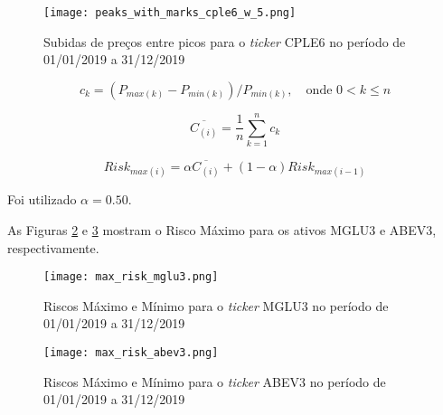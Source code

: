 \begin{itemize}
    \begin{figure}[h]
        \texttt{[image: peaks\_with\_marks\_cple6\_w\_5.png]}
        \centering
        \caption{Subidas de preços entre picos para o \textit{ticker} CPLE6 no período de 01/01/2019 a 31/12/2019}
        \label{fig:107}
    \end{figure}

    \begin{equation} \label{eq:40}
        c_k = (P_{max(k)} - P_{min(k)}) / P_{min(k)}, \quad \textrm{onde } 0 < k \le n
    \end{equation}

    \begin{equation} \label{eq:41}
        \overline{C_{(i)}} = \dfrac{1}{n} \sum_{k=1}^{n} c_k
    \end{equation}

    \begin{equation} \label{eq:42}
        Risk_{max(i)} = \alpha \overline{C_{(i)}} + (1 - \alpha) Risk_{max(i-1)}
    \end{equation}




    Foi utilizado \begin{math} \alpha = 0.50 \end{math}.

    As Figuras \ref{fig:108} e \ref{fig:270} mostram o Risco Máximo para os ativos MGLU3 e ABEV3, respectivamente.

    \begin{figure}[h]
        \texttt{[image: max\_risk\_mglu3.png]}
        \centering
        \caption{Riscos Máximo e Mínimo para o \textit{ticker} MGLU3 no período de 01/01/2019 a 31/12/2019}
        \label{fig:108}
    \end{figure}

    \begin{figure}[h]
        \texttt{[image: max\_risk\_abev3.png]}
        \centering
        \caption{Riscos Máximo e Mínimo para o \textit{ticker} ABEV3 no período de 01/01/2019 a 31/12/2019}
        \label{fig:270}
    \end{figure}

\end{itemize}



